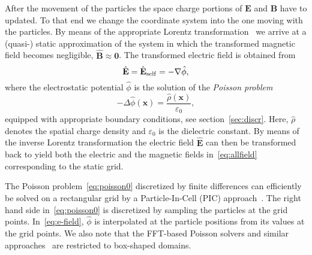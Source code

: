 After the movement of the particles the space charge portions of
$\mathbf{E}$ and $\mathbf{B}$ have to updated.  
To that end we change the coordinate system into the one moving with the
particles.  By means of the appropriate Lorentz
transformation~\cite{lali:84} we arrive at a (quasi-) static
approximation of the system in which the transformed magnetic field
becomes negligible, $\hat{\mathbf{B}}\! \approx\! \mathbf{0}$.  The
transformed electric field is obtained from
\begin{equation}\label{eq:e-field}
  \hat{\mathbf{E}}=\hat{\mathbf{E}}_{\RM{self}}=-\nabla\hat{\phi},
\end{equation}
where the electrostatic potential $\hat{\phi}$ is the solution of the
\emph{Poisson problem}
\begin{equation}\label{eq:poisson0}
  - \Delta \hat{\phi}(\mathbf{x}) =
  \frac{\hat{\rho}(\mathbf{x})}{\varepsilon_0},
\end{equation}
equipped with appropriate boundary conditions, see
section~\ref{sec:discr}.  Here, $\hat{\rho}$ denotes the spatial charge
density and $\varepsilon_0$ is the dielectric constant.
By means of the inverse Lorentz transformation the electric field
$\hat{\mathbf{E}}$ can then be transformed back to yield both the
electric and the magnetic fields in~\eqref{eq:allfield} corresponding to
the static grid.  

The Poisson problem~\eqref{eq:poisson0} discretized by finite
differences can efficiently be solved on a rectangular grid by a
Particle-In-Cell (PIC) approach~\cite{qiry:01}.  The right hand side
in~\eqref{eq:poisson0} is discretized by sampling the particles at the
grid points.  In~\eqref{eq:e-field}, $\hat{\phi}$ is interpolated at the
particle positions from its values at the grid points. We also note that
the FFT-based Poisson solvers and similar
approaches~\cite{qiry:01,qigl:04} are restricted to box-shaped domains.
 

